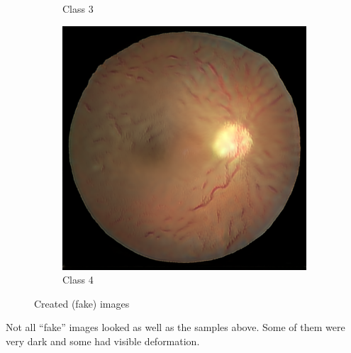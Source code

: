\documentclass[sigconf,nonacm]{acmart}
\begin{document}
\begin{figure}[H]
\begin{subfigure}{0.18\linewidth}
\caption{Class 3}
\end{subfigure}
\begin{subfigure}{0.18\linewidth}
\centering
\includegraphics[width=0.9\linewidth]{fake-class4.png}
\caption{Class 4}
\end{subfigure}
\caption{Created (fake) images}
\label{fig:gan-fake}
\end{figure}

Not all ``fake'' images looked as well as the samples above.
Some of them were very dark and some had visible deformation.
\end{document}

